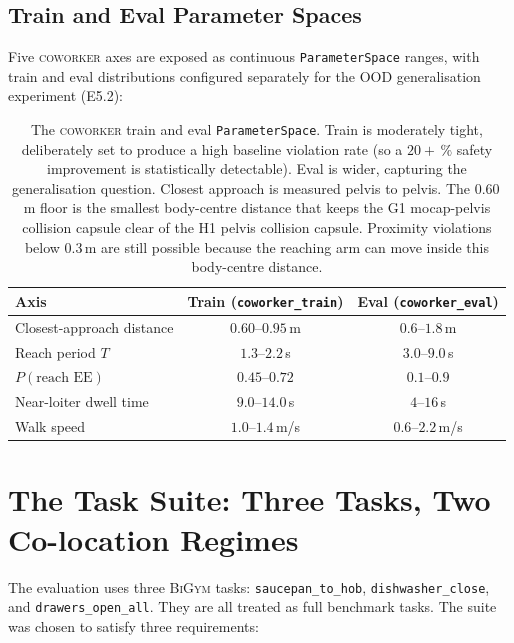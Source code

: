 \documentclass[11pt,a4paper]{report}
\newcommand{\bigym}{\textsc{BiGym}}
\newcommand{\coworker}{\textsc{coworker}}
\begin{document}
\subsection{Train and Eval Parameter Spaces}
\label{sec:bench:coworker:params}

Five \coworker{} axes are exposed as continuous
\texttt{ParameterSpace} ranges, with train and eval distributions
configured separately for the OOD generalisation experiment (E5.2):

\begin{table}[htbp]
\centering
\small
\caption{The \coworker{} train and eval \texttt{ParameterSpace}.
Train is moderately tight, deliberately set to produce a high
baseline violation rate (so a $20+\,\%$ safety improvement is
statistically detectable). Eval is wider, capturing the
generalisation question. Closest approach is measured pelvis to pelvis.
The 0.60\,m floor is the smallest body-centre distance that keeps the
G1 mocap-pelvis collision capsule clear of the H1 pelvis collision
capsule. Proximity violations below 0.3\,m are still possible because
the reaching arm can move inside this body-centre distance.}
\label{tab:coworker-params}
\begin{tabular}{lcc}
\toprule
Axis & Train (\texttt{coworker\_train}) & Eval (\texttt{coworker\_eval}) \\
\midrule
Closest-approach distance     & $0.60$--$0.95$\,m  & $0.6$--$1.8$\,m  \\
Reach period $T$              & $1.3$--$2.2$\,s    & $3.0$--$9.0$\,s  \\
$P(\text{reach EE})$          & $0.45$--$0.72$     & $0.1$--$0.9$     \\
Near-loiter dwell time        & $9.0$--$14.0$\,s   & $4$--$16$\,s     \\
Walk speed                    & $1.0$--$1.4$\,m/s  & $0.6$--$2.2$\,m/s\\
\bottomrule
\end{tabular}
\end{table}

\section{The Task Suite: Three Tasks, Two Co-location Regimes}
\label{sec:bench:task}

The evaluation uses three \bigym{} tasks:
\texttt{saucepan\_to\_hob}, \texttt{dishwasher\_close}, and
\texttt{drawers\_open\_all}. They are all treated as full benchmark
tasks. The suite was chosen to satisfy three requirements:
\end{document}
